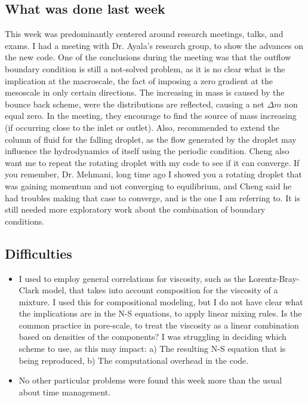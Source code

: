 \documentclass[12pt]{article}
\begin{document}
	\subsection*{What was done last week}
	This week was predominantly centered around research meetings, talks, and exams. I had a meeting with Dr. Ayala's research group, to show the advances on the new code. One of the conclusions during the meeting was that the outflow boundary condition is still a not-solved problem, as it is no clear what is the implication at the macroscale, the fact of imposing a zero gradient at the mesoscale in only certain directions. The increasing in mass is caused by the bounce back scheme, were the distributions are reflected, causing a net $\Delta m$ non equal zero. In the meeting, they encourage to find the source of mass increasing (if occurring close to the inlet or outlet). Also, recommended to extend the column of fluid for the falling droplet, as the flow generated by the droplet may influence the hydrodynamics of itself using the periodic condition. Cheng also want me to repeat the rotating droplet with my code to see if it can converge. If you remember, Dr. Mehmani, long time ago I showed you a rotating droplet that was gaining momentum and not converging to equilibrium, and Cheng said he had troubles making that case to converge, and is the one I am referring to. It is still needed more exploratory work about the combination of boundary conditions. 
	
	\subsection*{Difficulties}
	\begin{itemize}
		\item I used to employ general correlations for viscosity, such as the Lorentz-Bray-Clark model, that takes into account composition for the viscosity of a mixture. I used this for compositional modeling, but I do not have clear what the implications are in the N-S equations, to apply linear mixing rules. Is the common practice in pore-scale, to treat the viscosity as a linear combination based on densities of the components? I was struggling in deciding which scheme to use, as this may impact: a) The resulting N-S equation that is being reproduced, b) The computational overhead in the code. 
		
		\item No other particular problems were found this week more than the usual about time management.
	\end{itemize}
	
\end{document}
